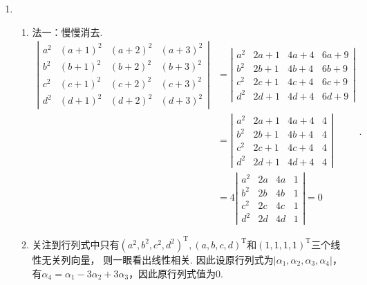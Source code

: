 \begin{enumerate}
    \item \begin{enumerate}
        \item 法一：慢慢消去. \[\begin{aligned}
            \left|\begin{array}{llll}
            a^{2} & (a+1)^{2} & (a+2)^{2} & (a+3)^{2} \\
            b^{2} & (b+1)^{2} & (b+2)^{2} & (b+3)^{2} \\
            c^{2} & (c+1)^{2} & (c+2)^{2} & (c+3)^{2} \\
            d^{2} & (d+1)^{2} & (d+2)^{2} & (d+3)^{2}
            \end{array}\right|&=
            \left|\begin{array}{llll}
            a^{2} & 2a+1 & 4a+4 & 6a+9 \\
            b^{2} & 2b+1 & 4b+4 & 6b+9 \\
            c^{2} & 2c+1 & 4c+4 & 6c+9 \\
            d^{2} & 2d+1 & 4d+4 & 6d+9
            \end{array}\right|\\&=
            \left|\begin{array}{llll}
            a^{2} & 2a+1 & 4a+4 & 4 \\
            b^{2} & 2b+1 & 4b+4 & 4 \\
            c^{2} & 2c+1 & 4c+4 & 4 \\
            d^{2} & 2d+1 & 4d+4 & 4
            \end{array}\right|\\
            &=4\left|\begin{array}{llll}
            a^{2} & 2a & 4a & 1 \\
            b^{2} & 2b & 4b & 1 \\
            c^{2} & 2c & 4c & 1 \\
            d^{2} & 2d & 4d & 1
            \end{array}\right|=0
            \end{aligned}.\]
        \item 关注到行列式中只有$(a^2, b^2, c^2, d^2)^\mathrm{T}, (a, b, c, d)^\mathrm{T}$和$(1, 1, 1, 1)^\mathrm{T}$三个线性无关列向量，
        则一眼看出线性相关. 因此设原行列式为$|\alpha_1, \alpha_2, \alpha_3, \alpha_4|$，有$\alpha_4=\alpha_1-3\alpha_2+3\alpha_3$，因此原行列式值为0.
    \end{enumerate}


\end{enumerate}

